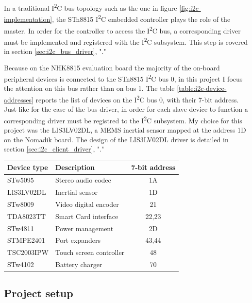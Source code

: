 \documentclass[a4paper,10pt]{article}
\makeatletter
\newenvironment{tablehere}{\def\@captype{table}}{}
\newcommand{\iic}{I\textsuperscript{2}C }
\makeatother
\begin{document}
\begin{multicols}{2}
In a traditional \iic bus topology such as the one in figure
\ref{fig:i2c-implementation}, the STn8815 \iic embedded controller plays the
role of the master. In order for the controller to access the \iic bus, a
corresponding driver must be implemented and registered with the \iic
subsystem. This step is covered in section \ref{sec:i2c_bus_driver},
"."

Because on the NHK8815 evaluation board the majority of the on-board peripheral
devices is connected to the STn8815 \iic bus 0, in this project I focus the
attention on this bus rather than on bus 1.
The table \ref{table:i2c-device-addresses} reports the list of devices on 
the \iic bus 0, with their 7-bit address.
Just like for the case of the bus driver, in order for each slave device
to function a corresponding driver must be registred to the \iic subsystem.
My choice for this project was the LIS3LV02DL, a MEMS inertial sensor mapped
at the address 1D on the Nomadik board.
The design of the LIS3LV02DL driver is detailed in section
\ref{sec:i2c_client_driver}, "."\\[6pt]

\begin{tablehere}
	\centering
	\renewcommand{\arraystretch}{1.2}	
	\begin{tabular}{l l c}
		\hline
		Device type & Description & 7-bit address \\
		\hline
		STw5095 & Stereo audio codec & 1A \\
		LIS3LV02DL & Inertial sensor & 1D \\
		STw8009 & Video digital encoder	 & 21 \\
		TDA8023TT & Smart Card interface & 22,23 \\
		STw4811 & Power management & 2D \\
		STMPE2401 & Port expanders & 43,44 \\
		TSC2003IPW & Touch screen controller & 48 \\
		STw4102 & Battery charger & 70 \\
		\hline
	\end{tabular}
	\caption{NHK8815 \iic device address map.}
	\label{table:i2c-device-addresses}
\end{tablehere}



\subsection{Project setup}
\label{sec:project_setup}


\end{multicols}
\end{document}
